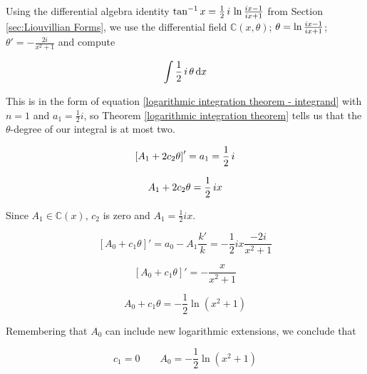 Using the differential algebra identity $\tan^{-1} x =
{1\over2}\,i\,\ln {{ix-1}\over{ix+1}}$ from
Section \ref{sec:Liouvillian Forms}, we use the differential field
${\mathbb C}(x,\theta)$; $\theta = \ln {{ix-1}\over{ix+1}}$; $\theta'
= - \frac{2i}{x^2+1}$ and compute


$$\int {1\over2}\,i\,\theta\, {\rm d}x$$

This is in the form of equation \eqref{logarithmic integration theorem - integrand}
with $n=1$ and $a_1=\frac{1}{2}i$, so
Theorem \ref{logarithmic integration theorem} tells us that
the $\theta$-degree of our integral is at most two.

$$\left[ A_1 + 2 c_2 \theta \right]' = a_1 = {1\over2}\,i$$

$$A_1 + 2 c_2 \theta = {1\over2}\,i x$$

Since $A_1 \in {\mathbb C}(x)$, $c_2$ is zero and $A_1 = \frac{1}{2}ix$.

$$\left[ A_0 + c_1 \theta \right]' = a_0 - A_1 \frac{k'}{k} = - \frac{1}{2}ix \frac{-2i}{x^2+1}$$

\begin{comment}
Integrating both sides we obtain:

$$c_2\theta + a_1 = {1\over2}\,i\,x + c_1$$

Equating coefficients again (and remembering that
$a_1 \in {\mathbb C}(x)$) leads us to conclude that

$$c_2=0 \qquad a_1 = {1\over2}\,i\,x + c_1$$

Finally,

$$a_1\theta' + a_0' = 0$$
$$\left({1\over2}\,i\,x + c_1\right)\theta' + a_0' = 0$$

Since $c_1$ is unknown, we'll leave it on the left-hand side along
with the unknown $a_0$ and move all of our knowns to the right-hand
side, taking advantage of our knowledge of $\theta'$:

$$c_1\theta' + a_0' = {1\over2}\,i\,x \frac{2i}{x^2+1}$$
\end{comment}

$$\left[ A_0 + c_1\theta \right]' = - \frac{x}{x^2+1}$$


$$A_0 + c_1\theta = - \frac{1}{2}\ln(x^2+1)$$

Remembering that $A_0$ can include new logarithmic extensions, we
conclude that

$$c_1 = 0 \qquad A_0 = - \frac{1}{2}\ln(x^2+1)$$

